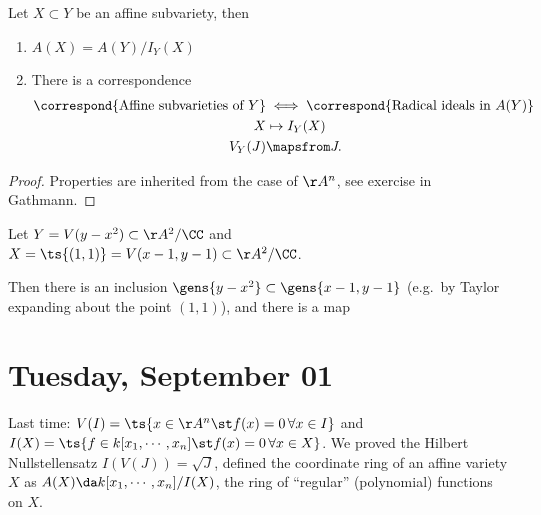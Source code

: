 \begin{theorem}[?]

Let \(X\subset Y\) be an affine subvariety, then

\begin{enumerate}
\def\labelenumi{\alph{enumi}.}
\item
  \(A(X) = A(Y) / I_Y(X)\)
\item
  There is a correspondence
  \begin{align*}  
  \correspond{\text{Affine subvarieties of }Y} 
  &\iff \correspond{\text{Radical ideals in }A(Y)} \\
  X &\mapsto I_Y(X) \\
  V_Y(J) &\mapsfrom J
  .\end{align*}
\end{enumerate}

\end{theorem}

\begin{proof}

Properties are inherited from the case of \(\AA^n\), see exercise in
Gathmann.

\end{proof}

\begin{example}

Let \(Y = V(y-x^2) \subset \AA^2/\CC\) and
\(X = \ts{(1, 1)} = V(x-1, y-1)\subset \AA^2/\CC\).

Then there is an inclusion \(\gens{y-x^2} \subset \gens{x-1, y-1}\)
(e.g.~by Taylor expanding about the point \((1, 1)\)), and there is a
map

\begin{center}\end{center}

\end{example}

\hypertarget{tuesday-september-01}{%
\section{Tuesday, September 01}\label{tuesday-september-01}}

Last time: \(V(I) = \ts{x\in \AA^n \st f(x) = 0 \, \forall x\in I}\) and
\(I(X) = \ts{f\in k[x_1, \cdots, x_n] \st f(x) = 0\, \forall x\in X}\).
We proved the Hilbert Nullstellensatz \(I(V(J)) = \sqrt{J}\), defined
the coordinate ring of an affine variety \(X\) as
\(A(X) \da k[x_1, \cdots, x_n] / I(X)\), the ring of ``regular''
(polynomial) functions on \(X\).

